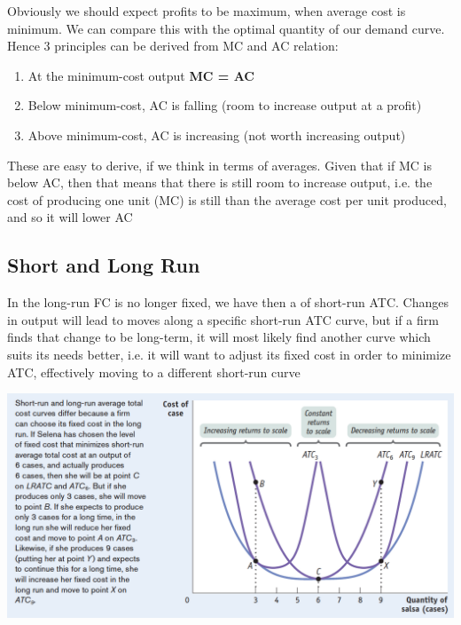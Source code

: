 \documentclass[english,course,draft]{Notes}
\begin{document}
\par{Obviously we should expect profits to be maximum, when average cost is minimum. We can compare this with the optimal quantity of our demand curve. Hence 3 principles can be derived from MC and AC relation:}

\begin{enumerate}
\item At the minimum-cost output \textbf{MC = AC} 
\item Below minimum-cost, AC is falling (room to increase output at a profit)
\item Above minimum-cost, AC is increasing (not worth increasing output)
\end{enumerate}

\par{These are easy to derive, if we think in terms of averages. Given that if MC is below AC, then that means that there is still room to increase output, i.e. the cost of producing one unit (MC) is still  than the average cost per unit produced, and so it will lower AC}



\subsection{Short and Long Run}

\par{In the long-run FC is no longer fixed, we have then a  of short-run ATC. Changes in output will lead to moves along a specific short-run ATC curve, but if a firm finds that change to be long-term, it will most likely find another curve which suits its needs better, i.e. it will want to adjust its fixed cost in order to minimize ATC, effectively moving to a different short-run curve}


\includegraphics[width=\textwidth]{LRATC}
\end{document}
